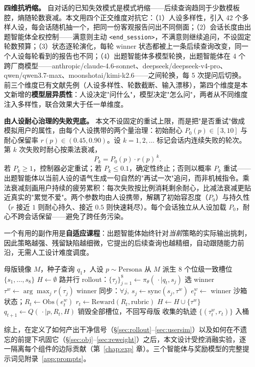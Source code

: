 \textbf{四维抗坍缩。} 自对话的已知失效模式是模式坍缩——后续查询趋同于少数模板腔，熵随轮数衰减。本文用四个正交维度对抗它：（1）人设多样性，引入 42 个多样人设，每会话随机抽一个，把同一份客观报告问出不同侧面；（2）会话长度由出题智能体全权控制——满意则主动 \texttt{<end\_session>}，不满意则继续追问，不设固定轮数预算；（3）状态逐轮演化，每轮 winner 状态都被上一条后续查询改变，同一个人设每轮看到的报告也不同；（4）出题智能体多模型轮换，出题智能体在 4 个跨厂商模型——anthropic/claude-4.6-sonnet、deepseek/deepseek-v4-pro、qwen/qwen3.7-max、moonshotai/kimi-k2.6——之间轮换，每 5 次提问后切换。前三个维度已有文献先例（人设多样性、轮数截断、输入漂移），第四个维度是本文新增的\textbf{模型层异质性}：人设决定"问什么"，模型决定"怎么问"，两者从不同维度注入多样性，联合效果大于任一单维度。

\textbf{由人设耐心治理的失败兜底。} 本文不设固定的重试上限，而是把"是否重试"做成模拟用户的属性，由每个人设携带的两个量治理：初始耐心 $P_0(p)\in[3,10]$ 与耐心保留率 $r(p)\in(0.45,0.90)$。设 $k=1,2,\dots$ 标记会话内连续失败的轮次。第 $k$ 次失败时耐心按乘法衰减，
\begin{equation}
\label{eq:patience}
P_k = P_0(p) \cdot r(p)^{\,k}.
\end{equation}
若 $P_k\ge 1$，控制器必定重试；若 $P_k\le 0.1$，确定性终止；否则以概率 $P_k$ 重试——出题智能体以当前人设的语气生成一句自然的"再试一次"追问，而非机械指令。乘法衰减刻画用户持续的疲劳累积：每次失败按比例消耗剩余耐心，比减法衰减更贴近真实的"累觉不爱"。两个参数均由人设携带，解耦了初始容忍度（$P_0$）与持久性（$r$ 接近 $1$ 则耐心持久、接近 $0.5$ 则快速耗尽）。每个会话独立从人设加载 $P_0$，耐心不跨会话保留——避免了跨任务污染。

一个有用的副作用是\textbf{自适应课程}：出题智能体始终针对\textit{当前}策略的实际输出挑刺，因此策略越强、残留缺陷越细微，它提出的后续查询也越精细，自动跟随能力前沿，无需人工设计难度调度。

\begin{algorithm}[htbp]
\caption{winner 同步会话 + 三智能体在线多轮构造（单会话）}
\label{alg:session}
\begin{algorithmic}[1]
\Require 母版镜像 $M$，种子查询 $q_1$，人设 $p\sim\mathrm{Persona}$
\State 从 $M$ 派生 8 个位级一致槽位 $\{s_1,\dots,s_8\}$
\State $H \gets \emptyset$ 
   路并行 rollout：$\{\tau_j\}_{j=1}^{8} \gets \pi_\theta(\,\cdot\mid q_t, s_j)$
  \State 选 winner $\tau^w \gets \arg\max_j r(\tau_j)$
  \State winner 同步：$\forall j,\ s_j \gets \mathrm{sync}(s_j, \tau^w)$ 
  \State $e_t^w \gets$ winner 沙箱状态；$R_t \gets \mathrm{Obs}(e_t^w)$ 
  \State $r_t \gets \mathrm{Reward}(R_t, \text{rubric})$ 
  \State $H \gets H \cup \{\tau^w\}$
  \State $q_{t+1} \gets Q(\,\cdot\mid p, R_t, H)$ 
\EndFor
\State 销毁全部槽位，不回写母版
\State \Return 收集的轨迹 $\{(\tau^w_t, r_t)\}$ 入桶
\end{algorithmic}
\end{algorithm}

综上，在定义了如何产出干净信号（\S\ref{sec:rollout}--\ref{sec:usersim}）以及如何在不遗忘的前提下巩固它（\S\ref{sec:obj}--\ref{sec:reweight}）之后，本文设计受控消融实验，逐一隔离每个组件的边际贡献（第~\ref{chap:exp} 章）。三个智能体与奖励模型的完整提示词见附录~\ref{app:prompts}。
